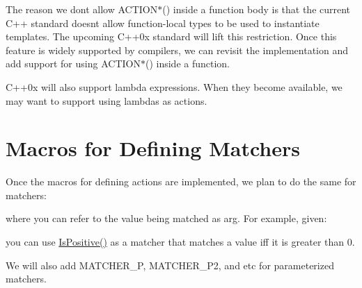 The reason we don\textquotesingle{}t allow {\ttfamily A\+C\+T\+I\+O\+N$\ast$()} inside a function body is that the current C++ standard doesn\textquotesingle{}t allow function-\/local types to be used to instantiate templates. The upcoming C++0x standard will lift this restriction. Once this feature is widely supported by compilers, we can revisit the implementation and add support for using {\ttfamily A\+C\+T\+I\+O\+N$\ast$()} inside a function.

C++0x will also support lambda expressions. When they become available, we may want to support using lambdas as actions.

\section*{Macros for Defining Matchers}

Once the macros for defining actions are implemented, we plan to do the same for matchers\+:


\begin{DoxyCode}{0}
\end{DoxyCode}


where you can refer to the value being matched as {\ttfamily arg}. For example, given\+:


\begin{DoxyCode}{0}
\end{DoxyCode}


you can use {\ttfamily \mbox{\hyperlink{namespacetesting_1_1gmock__matchers__test_a70e728cf67d0224c3ebb9eb8959cc39d}{Is\+Positive()}}} as a matcher that matches a value iff it is greater than 0.

We will also add {\ttfamily M\+A\+T\+C\+H\+E\+R\+\_\+P}, {\ttfamily M\+A\+T\+C\+H\+E\+R\+\_\+\+P2}, and etc for parameterized matchers. 